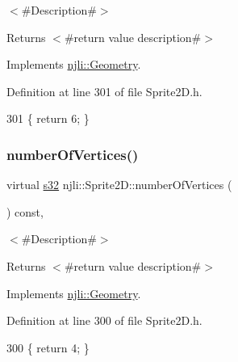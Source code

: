 $<$\#\+Description\#$>$

\begin{DoxyReturn}{Returns}
$<$\#return value description\#$>$ 
\end{DoxyReturn}


Implements \mbox{\hyperlink{classnjli_1_1_geometry_a1033c9f6dee9f725b122c2ddd33f4b0e}{njli\+::\+Geometry}}.



Definition at line 301 of file Sprite2\+D.\+h.


\begin{DoxyCode}
301 \{ \textcolor{keywordflow}{return} 6; \}
\end{DoxyCode}
\mbox{\label{classnjli_1_1_sprite2_d_ae13602610a36e2636c0416a500847dc7}} 
\subsubsection{\texorpdfstring{number\+Of\+Vertices()}{numberOfVertices()}}
{\footnotesize\ttfamily virtual \mbox{\hyperlink{_util_8h_aa62c75d314a0d1f37f79c4b73b2292e2}{s32}} njli\+::\+Sprite2\+D\+::number\+Of\+Vertices (\begin{DoxyParamCaption}{ }\end{DoxyParamCaption}) const\hspace{0.3cm}{\ttfamily [inline]}, {\ttfamily [virtual]}}

$<$\#\+Description\#$>$

\begin{DoxyReturn}{Returns}
$<$\#return value description\#$>$ 
\end{DoxyReturn}


Implements \mbox{\hyperlink{classnjli_1_1_geometry_a27b42b7a7ed3c67a6f8827288828687a}{njli\+::\+Geometry}}.



Definition at line 300 of file Sprite2\+D.\+h.


\begin{DoxyCode}
300 \{ \textcolor{keywordflow}{return} 4; \}
\end{DoxyCode}
\mbox{\label{classnjli_1_1_sprite2_d_a565b51d4b11b9d35f6ca7e54fbf7fb8e}} 
